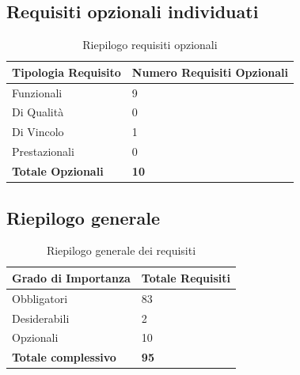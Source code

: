 \subsection{Requisiti opzionali individuati}
\begin{table}[ht]
	\centering
	\renewcommand{\arraystretch}{1.4}
	\begin{tabularx}{0.8\textwidth}{|l|X|}
		\hline
		\rowcolor{primarycolor!10}
		\textbf{Tipologia Requisito} & \textbf{Numero Requisiti Opzionali} \\
		\hline
		Funzionali & 9 \\
		\hline
		Di Qualità & 0 \\
		\hline
		Di Vincolo & 1 \\
		\hline
		Prestazionali & 0 \\
		\hline
		\textbf{Totale Opzionali} & \textbf{10} \\
		\hline
	\end{tabularx}
	\caption{Riepilogo requisiti opzionali}
\end{table}

\subsection{Riepilogo generale}
\begin{table}[ht]
	\centering
	\renewcommand{\arraystretch}{1.4}
	\begin{tabularx}{0.8\textwidth}{|l|X|}
		\hline
		\rowcolor{primarycolor!10}
		\textbf{Grado di Importanza} & \textbf{Totale Requisiti} \\
		\hline
		Obbligatori & 83 \\
		\hline
		Desiderabili & 2 \\
		\hline
		Opzionali & 10 \\
		\hline
		\textbf{Totale complessivo} & \textbf{95} \\
		\hline
	\end{tabularx}
	\caption{Riepilogo generale dei requisiti}
\end{table}